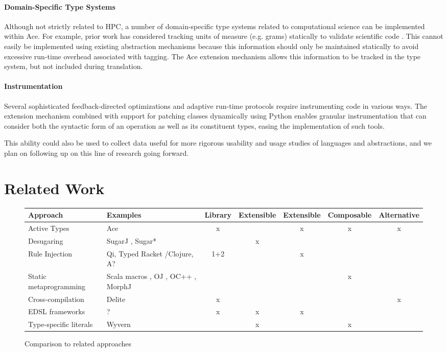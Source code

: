 \documentclass[9pt,preprint]{sigplanconf}
\begin{document}
\paragraph{Domain-Specific Type Systems}
Although not strictly related to HPC, a number of domain-specific type systems related to computational science can be implemented within Ace. For example, prior work has considered tracking units of measure (e.g. grams) statically to validate scientific code \cite{conf/cefp/Kennedy09}. This cannot easily be implemented using existing abstraction mechanisms because this information should only be maintained statically to avoid excessive run-time overhead associated with tagging. The Ace extension mechanism allows this information to be tracked in the type system, but not included during translation.


\paragraph{Instrumentation}
Several sophisticated feedback-directed optimizations and adaptive run-time protocols require instrumenting code in various ways. The extension mechanism combined with support for patching classes dynamically using Python enables granular instrumentation that can consider both the syntactic form of an operation as well as its constituent types, easing the implementation of such tools.

This ability could also be used to collect data useful for more rigorous usability and usage studies of languages and abstractions, and we plan on following up on this line of research going forward.



\section{Related Work}\label{related}
\begin{figure*}
\begin{tabular}[t]{ l | l | c c c c c }
\textbf{Approach} & \textbf{Examples} & Library & {Extensible} & Extensible & Composable & Alternative \\
\hline
Active Types & Ace & x & ~ & x & x & x\\
Desugaring & SugarJ \cite{erdweg2011sugarj}, Sugar* & ~ & x & ~ & ~ & ~\\
Rule Injection & Qi, Typed Racket \cite{TypedScheme2008}/Clojure, A? & 1+2 & ~ & x & ~ & ~\\
Static metaprogramming & Scala macros \cite{ScalaMacros2013}, OJ \cite{OpenJava2000}, OC++ \cite{OpenCpp1995}, MorphJ \cite{MorphJ2011} & ~ & ~ & ~ & x & ~\\
Cross-compilation & Delite \cite{Delite2011} & x & ~ & ~ & ~ & x\\
EDSL frameworks & ? & x & x & x & ~ & ~\\
Type-specific literals & Wyvern & ~ & x & ~ & x & ~\\
\end{tabular}
\caption{Comparison to related approaches}
\end{figure*}
\end{document}
